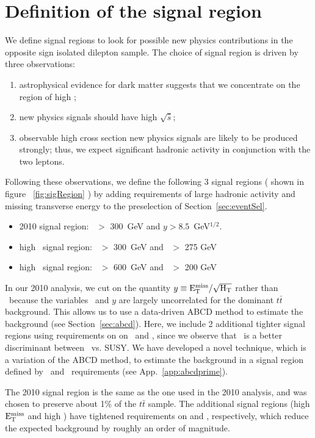 \section{Definition of the signal region}
\label{sec:sigregion}

We define signal regions to look for possible
new physics contributions in the opposite sign isolated 
dilepton sample. The choice of signal region is driven by 
three observations:
\begin{enumerate}
\item astrophysical evidence for dark matter suggests that
we concentrate on the region of high \met;
\item new physics signals should have high $\sqrt{\hat{s}}$;
\item observable high cross section new physics signals 
are likely to be produced strongly;  thus, we expect significant
hadronic activity in conjunction with the two leptons.
\end{enumerate}

Following these observations, we define the following 3 signal regions ( shown
in figure ~\ref{fig:sigRegion} ) by adding requirements of large hadronic activity and missing
transverse energy to the preselection of Section~\ref{sec:eventSel}.
\begin{itemize}
\item 2010 signal region:       \Ht\ $>$ 300~GeV and $y > 8.5$~GeV$^{1/2}$.
\item high \met\ signal region: \Ht\ $>$ 300~GeV and \met\ $>$ 275 GeV
\item high \Ht\  signal region: \Ht\ $>$ 600~GeV and \met\ $>$ 200 GeV
\end{itemize}

In our 2010 analysis, we cut on the quantity $y \equiv \rm E_{T}^{miss}/\sqrt{H_T}$ rather than \met\
because the variables \Ht\ and $y$ are
largely uncorrelated for the dominant $t\bar{t}$ background.  
This allows us to use a data-driven ABCD method to estimate the
background (see Section~\ref{sec:abcd}). Here, we include 2 additional tighter signal
regions using requirements on on \met\ and \Ht, since we observe that \met\ is a better 
discriminant between \ttbar\ vs. SUSY. We have developed a novel technique, which is a 
variation of the ABCD method, to estimate the background in a signal region defined by
\met\ and \Ht\ requirements (see App.~\ref{app:abcdprime}).

The 2010 signal region is the same as the one used in the 2010 analysis, and was
chosen to preserve about 1\% of the $t\bar{t}$ sample.
The additional signal regions (high $\rm E_{T}^{miss}$ and high \Ht) have tightened requirements
on \met and \Ht, respectively, which reduce the expected background by roughly
an order of magnitude.

